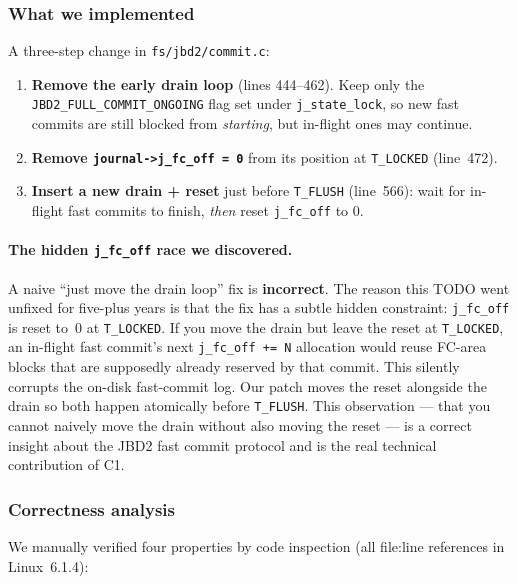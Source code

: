 \documentclass[12pt,a4paper]{article}
\begin{document}
\subsubsection{What we implemented}

A three-step change in \texttt{fs/jbd2/commit.c}:

\begin{enumerate}[leftmargin=*]
  \item \textbf{Remove the early drain loop} (lines 444--462). Keep
        only the \texttt{JBD2\_FULL\_COMMIT\_ONGOING} flag set under
        \texttt{j\_state\_lock}, so new fast commits are still blocked
        from \emph{starting}, but in-flight ones may continue.
  \item \textbf{Remove \texttt{journal->j\_fc\_off = 0}} from its
        position at \texttt{T\_LOCKED} (line~472).
  \item \textbf{Insert a new drain + reset} just before
        \texttt{T\_FLUSH} (line~566): wait for in-flight fast commits
        to finish, \emph{then} reset \texttt{j\_fc\_off} to 0.
\end{enumerate}

\paragraph{The hidden \texttt{j\_fc\_off} race we discovered.}
A naive ``just move the drain loop'' fix is \textbf{incorrect}.  The
reason this TODO went unfixed for five-plus years is that the fix has
a subtle hidden constraint: \texttt{j\_fc\_off} is reset to~0 at
\texttt{T\_LOCKED}.  If you move the drain but leave the reset at
\texttt{T\_LOCKED}, an in-flight fast commit's next
\texttt{j\_fc\_off += N} allocation would reuse FC-area blocks that
are supposedly already reserved by that commit.  This silently
corrupts the on-disk fast-commit log.  Our patch moves the reset
alongside the drain so both happen atomically before \texttt{T\_FLUSH}.
This observation --- that you cannot naively move the drain without
also moving the reset --- is a correct insight about the JBD2 fast
commit protocol and is the real technical contribution of C1.

\subsubsection{Correctness analysis}

We manually verified four properties by code inspection (all
file:line references in Linux~6.1.4):
\end{document}
